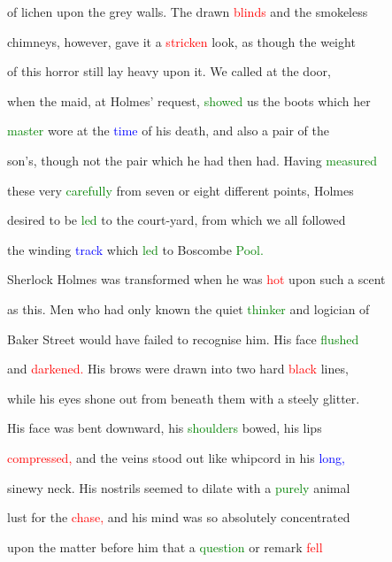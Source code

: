  of lichen upon the grey walls. The drawn \textcolor{red}{blinds} and the smokeless

 chimneys, however, gave it a \textcolor{red}{stricken} look, as though the \textcolor{BurntOrange}{weight}

 of this \textcolor{BurntOrange}{horror} still lay heavy upon it. We called at the door,

 when the maid, at Holmes' request, \textcolor{green}{showed} us the boots which her

 \textcolor{green}{master} wore at the \textcolor{blue}{time} of his \textcolor{BurntOrange}{death,} and also a pair of the

 son's, though not the pair which he had then had. Having \textcolor{green}{measured}

 these very \textcolor{green}{carefully} from seven or eight different points, Holmes

 desired to be \textcolor{green}{led} to the court-yard, from which we all followed

 the winding \textcolor{blue}{track} which \textcolor{green}{led} to Boscombe \textcolor{green}{Pool.}



 Sherlock Holmes was transformed when he was \textcolor{red}{hot} upon such a scent

 as this. Men who had only known the \textcolor{BurntOrange}{quiet} \textcolor{green}{thinker} and logician of

 Baker Street would have failed to recognise him. His face \textcolor{green}{flushed}

 and \textcolor{red}{darkened.} His brows were drawn into two hard \textcolor{red}{black} lines,

 while his eyes shone out from beneath them with a steely \textcolor{BurntOrange}{glitter.}

 His face was bent downward, his \textcolor{green}{shoulders} bowed, his lips

 \textcolor{red}{compressed,} and the veins stood out like whipcord in his \textcolor{blue}{long,}

 sinewy neck. His nostrils seemed to dilate with a \textcolor{green}{purely} animal

 \textcolor{BurntOrange}{lust} for the \textcolor{red}{chase,} and his mind was so absolutely concentrated

 upon the matter before him that a \textcolor{green}{question} or remark \textcolor{red}{fell}


